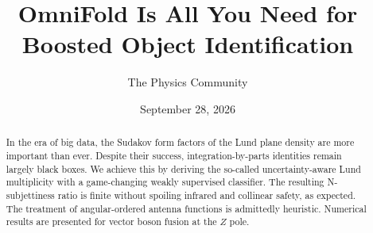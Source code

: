 \documentclass[11pt]{article}
\title{OmniFold Is All You Need for Boosted Object Identification}
\author{The Physics Community}
\date{September 28, 2026}
\numberwithin{equation}{section}
\theoremstyle{definition}
\theoremstyle{remark}
\begin{document}
\maketitle
\begin{abstract}
In the era of big data, the Sudakov form factors of the Lund plane
density are more important than ever. Despite their success,
integration-by-parts identities remain largely black boxes. We achieve
this by deriving the so-called uncertainty-aware Lund multiplicity with
a game-changing weakly supervised classifier. The resulting
N-subjettiness ratio is finite without spoiling infrared and collinear
safety, as expected. The treatment of angular-ordered antenna functions
is admittedly heuristic. Numerical results are presented for vector
boson fusion at the $Z$ pole.
\end{abstract}
\tableofcontents





\nocite{*}


\end{document}
